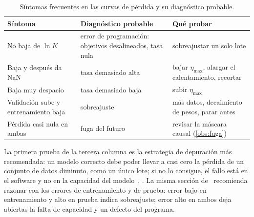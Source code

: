 \begin{table}[h]
\centering\small
\caption{Síntomas frecuentes en las curvas de pérdida y su diagnóstico probable.}\label{tab:sintomas}
\begin{tabularx}{\textwidth}{@{}>{\raggedright\arraybackslash}X>{\raggedright\arraybackslash}X>{\raggedright\arraybackslash}X@{}}
\toprule
Síntoma & Diagnóstico probable & Qué probar \\
\midrule
No baja de $\ln K$ & error de programación: objetivos desalineados, tasa nula & sobreajustar un solo lote \\
Baja y después da NaN & tasa demasiado alta & bajar $\eta_{\max}$, alargar el calentamiento, recortar \\
Baja muy despacio & tasa demasiado baja & subir $\eta_{\max}$ \\
Validación sube y entrenamiento baja & sobreajuste & más datos, decaimiento de pesos, parar antes \\
Pérdida casi nula en ambas & fuga del futuro & revisar la máscara causal (\cref{obs:fuga}) \\
\bottomrule
\end{tabularx}
\end{table}

La primera prueba de la tercera columna es la estrategia de depuración más recomendada: un modelo correcto debe poder llevar a casi cero la pérdida de un conjunto de datos diminuto, como un único lote; si no lo consigue, el fallo está en el software y no en la capacidad del modelo~\cite[§11.5]{gbc}, \cite[§7.2.3]{cs336}. La misma sección de~\cite{gbc} recomienda razonar con los errores de entrenamiento y de prueba: error bajo en entrenamiento y alto en prueba indica sobreajuste; error alto en ambos deja abiertas la falta de capacidad y un defecto del programa.

